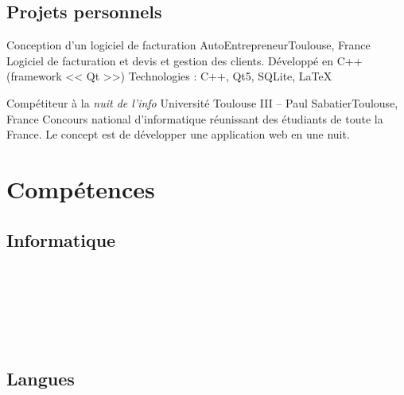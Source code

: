 \documentclass{my_cv_bis} \usepackage{wrapfig}
\begin{document}
		\newpage
	\subsection{Projets personnels}
	{Conception d'un logiciel de facturation}
	{AutoEntrepreneur}{Toulouse, France}
	{Logiciel de facturation et devis et gestion des clients. Développé en C++ (framework << Qt >>)
	} 
	{Technologies : C++, Qt5, SQLite, \LaTeX}

	{Compétiteur à la \textit{nuit de l'info}}
	{Université Toulouse III -- Paul Sabatier}{Toulouse, France}
	{ Concours national d’informatique réunissant des étudiants de toute la France. Le concept est de développer une application web en une nuit.} 
	{\vspace{10px}}

		\section{Compétences}
			\subsection{Informatique}
			\\
			\\
			\\
			\\
			\\

		\subsection{Langues}
			\vspace{10px}
\end{document}
